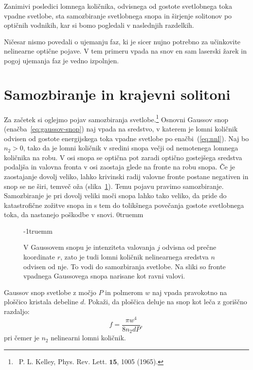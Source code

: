 Zanimivi posledici lomnega količnika, odvisnega od gostote svetlobnega toka vpadne svetlobe, 
sta samozbiranje svetlobnega snopa in širjenje solitonov po optičnih vodnikih, 
kar si bomo pogledali v naslednjih razdelkih.

\begin{remark}
Ničesar nismo povedali o ujemanju faz, ki je sicer nujno potrebno za učinkovite nelinearne 
optične pojave. V tem primeru vpada na snov en sam laserski žarek in pogoj ujemanja faz
je vedno izpolnjen. 
\end{remark}

\section{Samozbiranje in krajevni solitoni}
Za začetek si oglejmo pojav samozbiranja svetlobe.\footnote{~P. L. Kelley, 
Phys. Rev. Lett. $\mathbf{15}$, 1005 (1965).}
Osnovni Gaussov snop 
(enačba~\ref{eq:gaussov-snop}) naj vpada na sredstvo, v katerem je lomni 
količnik odvisen od gostote energijskega toka vpadne svetlobe po enačbi~(\ref{eq:nnl}).
Naj bo $n_{2}>0$, tako da je lomni količnik v sredini snopa večji 
od nemotenega lomnega količnika na robu. V osi snopa se optična pot 
zaradi optično gostejšega sredstva podaljša in valovna fronta 
v osi zaostaja glede na fronte na robu snopa. Če je zaostajanje dovolj veliko,
lahko krivinski radij valovne fronte postane negativen in snop se
ne širi, temveč oža (slika~\ref{fig:sf1}). Temu pojavu pravimo 
samozbiranje. Samozbiranje je pri dovolj
veliki moči snopa lahko tako veliko, da pride do katastrofične zožitve snopa
in s tem do tolikšnega povečanja gostote svetlobnega toka, da nastanejo
poškodbe v snovi.
\vglue0truemm
\begin{figure}[ht]
\centering
\def\svgwidth{95truemm} 

\caption{V Gaussovem snopu je intenziteta valovanja $j$ odvisna od prečne koordinate $r$, 
zato je tudi lomni količnik nelinearnega sredstva  $n$ odvisen od nje. To vodi do 
 samozbiranja svetlobe. Na sliki so fronte vpadnega Gaussovega snopa narisane kot ravni valovi.}
\label{fig:sf1}
\vglue-1truemm
\end{figure}
\begin{naloga}
Gaussov snop svetlobe z močjo $P$ in polmerom $w$ naj vpada pravokotno na ploščico
kristala debeline $d$. Pokaži, da ploščica deluje na snop kot leča z goriščno razdaljo:
\begin{equation}
f = \frac{\pi w^4}{8 n_2 d P},
\end{equation}
pri čemer je $n_2$ nelinearni lomni količnik.
\end{naloga}

